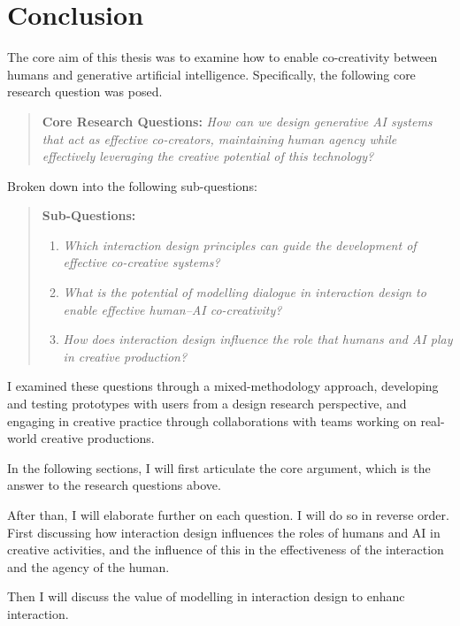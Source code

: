 \chapter[Conclusion]{Conclusion}\label{c:conclusion}

The core aim of this thesis was to examine how to enable co-creativity between humans and generative artificial intelligence. Specifically, the following core research question was posed. 

\begin{quote}
\textbf{Core Research Questions:}
\emph{How can we design generative AI systems that act as effective co-creators, maintaining human agency while effectively leveraging the creative potential of this technology?}
\end{quote}

Broken down into the following sub-questions: 

\begin{quote}
\textbf{Sub-Questions:}
\begin{enumerate}
    \item \emph{Which interaction design principles can guide the development of effective co-creative systems?}
    \item \emph{What is the potential of modelling dialogue in interaction design to enable effective human--AI co-creativity?}
    \item \emph{How does interaction design influence the role that humans and AI play in creative production?}
\end{enumerate}
\end{quote}


I examined these questions through a mixed-methodology approach, developing and testing prototypes with users from a design research perspective, and engaging in creative practice through collaborations with teams working on real-world creative productions.

In the following sections, I will first articulate the core argument, which is the answer to the research questions above. 

After than, I will elaborate further on each question. I will do so in reverse order. First discussing how interaction design influences the roles of humans and AI in creative activities, and the influence of this in the effectiveness of the interaction and the agency of the human. 

Then I will discuss the value of modelling in interaction design to enhanc interaction. 

